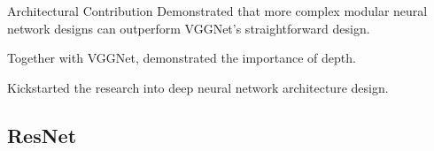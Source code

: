 \begin{frame}[allowframebreaks]

\begin{myconceptblock}{7.19}{Architectural Contribution}
    Demonstrated that more complex modular neural network designs can outperform VGGNet's straightforward design.

    Together with VGGNet, demonstrated the importance of depth.

    Kickstarted the research into deep neural network architecture design.
\end{myconceptblock}

\end{frame}

\subsection{ResNet}
